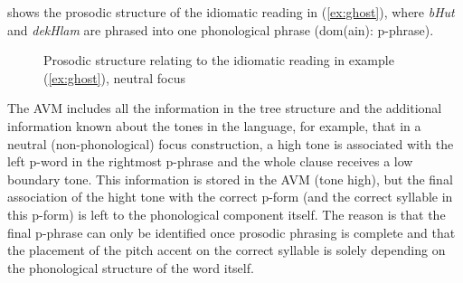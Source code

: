 \documentclass[output=paper,hidelinks]{langscibook}
\begin{document}
 shows the prosodic structure of the idiomatic reading in (\ref{ex:ghost}), where {\em bHut} and {\em dekHlam} are phrased into one phonological phrase ({\sc dom(ain): p-phrase}). 

\begin{figure}
{\small
\begin{center}
\caption{Prosodic structure relating to the idiomatic reading in example (\ref{ex:ghost}), neutral focus}
\label{fig:idio_neut}
\end{center}
}
\end{figure}

\noindent The AVM includes all the information in the tree structure and the additional information known about the tones in the language, for example, that in a neutral (non-phonological) focus construction, a 
high tone is associated with the left p-word in the rightmost p-phrase and the whole clause receives a low boundary tone. %
This information is stored in the AVM ({\sc tone high}), but the final association of the hight tone with the correct p-form (and the correct syllable in this p-form) is left to the phonological component itself. The reason is that the final p-phrase %
can only be identified once prosodic phrasing is complete and that the placement of the pitch accent  on the correct syllable is solely depending on the phonological structure of the word itself.
\end{document}
